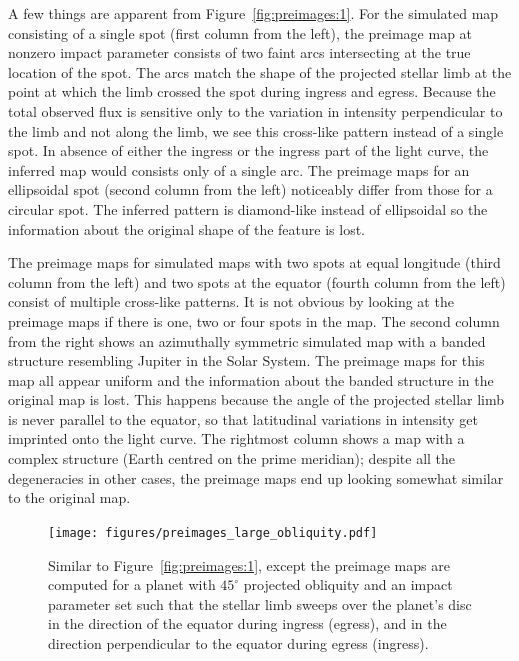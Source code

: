 \documentclass[12pt,dvipsnames]{report}
\begin{document}
A few things are apparent from Figure~\ref{fig:preimages:1}. For the simulated
map consisting of a single spot (first column from the left), the preimage map at
nonzero impact parameter consists of two faint arcs intersecting at the true
location of the spot. The arcs match the shape of the projected stellar limb at
the point at which the limb crossed the spot during ingress and egress. Because
the total observed flux is sensitive only to the variation in intensity
perpendicular to the limb and not along the limb, we see this cross-like
pattern instead of a single spot. In absence of either the ingress or the
ingress part of the light curve, the inferred map would consists only of a
single arc. The preimage maps for an ellipsoidal spot (second column from the
left) noticeably differ from those for a circular spot. 
The inferred pattern
is diamond-like instead of ellipsoidal so the information about the original
shape of the feature is lost.

The preimage maps for simulated maps with two spots at equal longitude (third
column from the left) and two spots at the equator (fourth column from the
left) consist of multiple cross-like patterns. It is not obvious by looking at
the preimage maps if there is one, two or four spots in the map. The second
column from the right shows an azimuthally symmetric simulated map with a banded
structure resembling Jupiter in the Solar System. The preimage maps for this
map all appear uniform and the information about
the banded structure in the original map is lost. This happens because the
angle of the projected stellar limb is never parallel to the equator, so that
latitudinal variations in intensity get imprinted onto the light curve. The
rightmost column shows a map with a complex structure (Earth centred on the
prime meridian); despite all the degeneracies in other cases, the preimage
maps end up looking somewhat similar to the original map.

\begin{figure}[t!]
    \begin{centering}
        \texttt{[image: figures/preimages\_large\_obliquity.pdf]}
        \caption{
            Similar to Figure~\ref{fig:preimages:1}, except the preimage maps are computed for a planet with
            $45^\circ$ projected obliquity
            and an impact parameter set such that the stellar limb sweeps over the planet's disc in the
            direction of the equator during ingress (egress), and in the direction perpendicular to
            the equator during egress (ingress).
        }
        \label{fig:preimages:2}
    \end{centering}
\end{figure}
\end{document}
